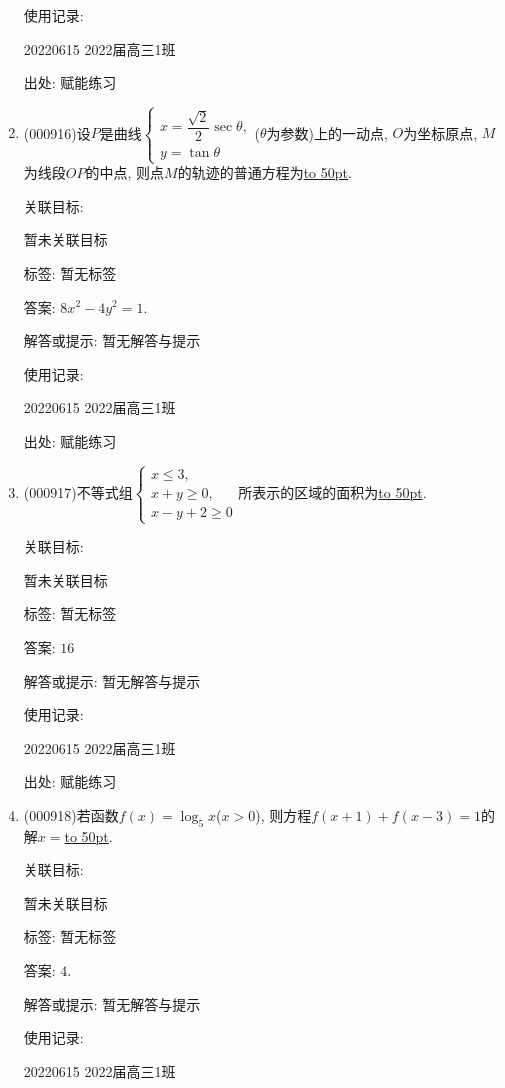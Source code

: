 \documentclass[10pt,a4paper]{article}
\newcommand{\blank}[1]{\underline{\hbox to #1pt{}}}
\begin{document}
\begin{enumerate}[1.]
使用记录:

20220615	2022届高三1班	


出处: 赋能练习
\item { (000916)}设$P$是曲线$\begin{cases} x=\dfrac{\sqrt2}2\sec \theta, \\ y=\tan \theta \end{cases}$($\theta $为参数)上的一动点, $O$为坐标原点, $M$为线段$OP$的中点, 则点$M$的轨迹的普通方程为\blank{50}.


关联目标:

暂未关联目标



标签: 暂无标签

答案: $8x^2-4y^2=1$.

解答或提示: 暂无解答与提示

使用记录:

20220615	2022届高三1班	


出处: 赋能练习
\item { (000917)}不等式组$\begin{cases} x\le 3, \\ x+y\ge 0, \\ x-y+2 \ge 0 \end{cases}$所表示的区域的面积为\blank{50}.


关联目标:

暂未关联目标



标签: 暂无标签

答案: $16$

解答或提示: 暂无解答与提示

使用记录:

20220615	2022届高三1班	


出处: 赋能练习
\item { (000918)}若函数$f(x)=\log _5 x$($x>0$), 则方程$f(x+1)+f(x-3)=1$的解$x=$\blank{50}.


关联目标:

暂未关联目标



标签: 暂无标签

答案: $4$.

解答或提示: 暂无解答与提示

使用记录:

20220615	2022届高三1班	



\end{enumerate}
\end{document}
